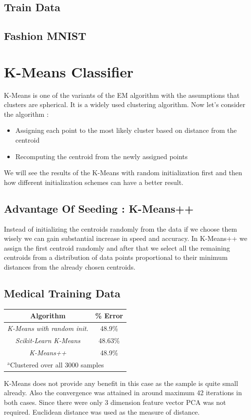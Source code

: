 \documentclass[conference]{IEEEtran}
\begin{document}
\subsection{Train Data}

\subsection{Fashion MNIST}

\section{\textbf{K-Means Classifier}}
K-Means is one of the variants of the EM algorithm with the assumptions that clusters are spherical. It is a widely used clustering algorithm. Now let's consider the algorithm :
\begin{itemize}
    \item Assigning each point to the most likely cluster based on distance from the centroid
    \item Recomputing the centroid from the newly assigned points
\end{itemize} 
We will see the results of the K-Means with random initialization first and then how different initialization schemes can have a better result.
\subsection{Advantage Of Seeding : \textbf{K-Means++}}
Instead of initializing the centroids randomly from the data if we choose them wisely we can gain substantial increase in speed and accuracy. In K-Means++ we assign the first centroid randomly and after that we select all the remaining centroids from a distribution of data points proportional to their minimum distances from the already chosen centroids.
\subsection{Medical Training Data}
\begin{table}[htbp]
\begin{center}
\begin{tabular}{|c|c|}
\hline
\textbf{Algorithm}&\textbf{\% Error} \\
\hline
\textit{K-Means with random init.} & 48.9\%\\
\hline
\textit{Scikit-Learn K-Means}& 48.63\%\\
\hline
\textit{K-Means++}&48.9\%\\
\hline
\multicolumn{4}{l}{$^{\mathrm{a}}$Clustered over all 3000 samples}
\end{tabular}
\label{tab1}
\end{center}
\end{table}
K-Means does not provide any benefit in this case as the sample is quite small already. Also the convergence was attained in around maximum 42 iterations in both cases. Since there were only 3 dimension feature vector PCA was not required. Euclidean distance was used as the measure of distance.
\end{document}

